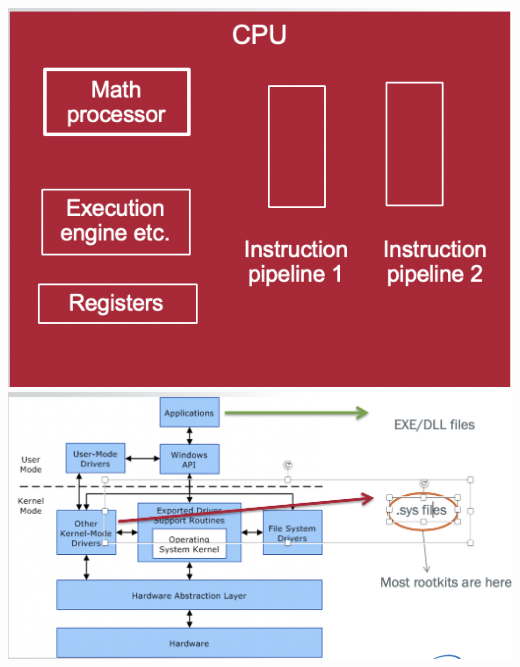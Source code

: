 \documentclass[12pt]{article}
\begin{document}
\begin{itemize}
\includegraphics{2.png}
\includegraphics{3.png}


\end{itemize}
\end{document}
